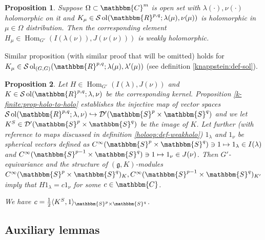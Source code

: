 \documentclass{article}
\newcommand{\tmop}[1]{\ensuremath{\operatorname{#1}}}
\newtheorem{proposition}{Proposition}
{\theorembodyfont{\rmfamily}\newtheorem{remark}{Remark}}
\begin{document}
\begin{proposition}
  \label{holoop:prop-main}Suppose $\Omega \subset \mathbbm{C}^m$ is open set
  with $\lambda (\cdot), \nu (\cdot)$ holomorphic on it and $K_{\mu} \in
  \mathcal{S} \tmop{ol} (\mathbbm{R}^{p, q} ; \lambda (\mu), \nu (\mu))$ is
  holomorphic in $\mu \in \Omega$ distribution. Then the corresponding element
  $H_{\mu} \in \tmop{Hom}_{G'} (I (\lambda (\nu)), J (\nu (\nu)))$ is weakly
  holomorphic.
\end{proposition}

\begin{remark}
  Similar proposition (with similar proof that will be omitted) holds for
  $K_{\mu} \in \mathcal{S} \tmop{ol}_{(G, G)} (\mathbbm{R}^{p, q} ; \lambda
  (\mu), \lambda' (\mu))$ (see definition \ref{knappstein:def-sol}).
\end{remark}

\begin{proposition}
  \label{holoop:prop-sphermult}Let $H \in \tmop{Hom}_{G'} (I (\lambda), J
  (\nu))$ and $K \in \mathcal{S} \tmop{ol} (\mathbbm{R}^{p, q} ; \lambda,
  \nu)$ be the corresponding kernel. Proposition
  \ref{k-finite:prop-holo-to-holo} establishes the injective map of vector
  spaces $\mathcal{S} \tmop{ol} (\mathbbm{R}^{p, q} ; \lambda, \nu)
  \hookrightarrow \mathcal{D}' (\mathbbm{S}^p \times \mathbbm{S}^q)$ and we
  let $K^S \in \mathcal{D}' (\mathbbm{S}^p \times \mathbbm{S}^q)$ be the image
  of $K$. Let further (with reference to maps discussed in definition
  \ref{holoop:def-weakholo}) $1_{\lambda}$ and $1_{\nu}$ be spherical vectors
  defined as $C^{\infty} (\mathbbm{S}^p \times \mathbbm{S}^q) \ni 1 \mapsto
  1_{\lambda} \in I (\lambda)$ and $C^{\infty} (\mathbbm{S}^{p - 1} \times
  \mathbbm{S}^q) \ni 1 \mapsto 1_{\nu} \in J (\nu)$. Then $G'$-equivariance
  and the structure of $(\mathfrak{g}, K)$-modules $C^{\infty} (\mathbbm{S}^p
  \times \mathbbm{S}^q)_K, C^{\infty} (\mathbbm{S}^{p - 1} \times
  \mathbbm{S}^q)_{K'}$ imply that $H 1_{\lambda} = c 1_{\nu}$ for some $c \in
  \mathbbm{C}$.
  
  We have $c = \frac{1}{2} \langle K^S, 1 \rangle_{\mathbbm{S}^p \times
  \mathbbm{S}^q}$.
\end{proposition}

\subsection{Auxiliary lemmas}
\end{document}
